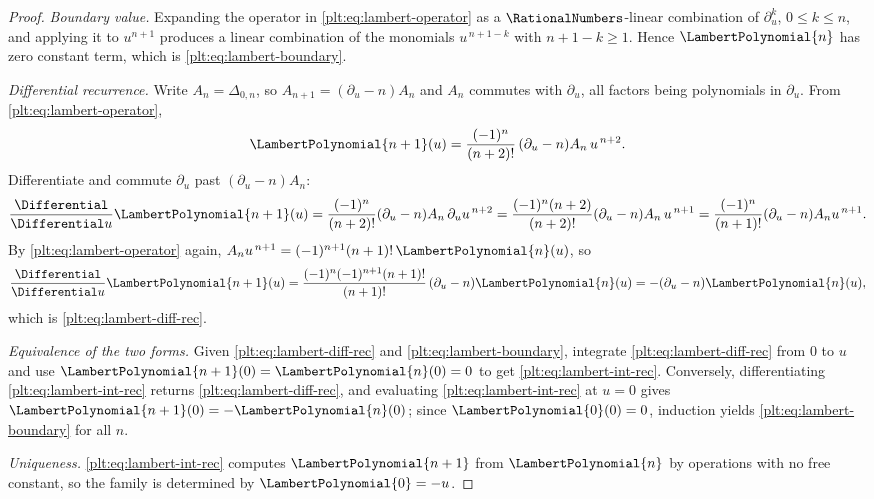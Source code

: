 \documentclass[11pt,oneside]{article}
\theoremstyle{plain}
\theoremstyle{definition}
\theoremstyle{remark}
\newcommand{\shiftop}[2]{\Delta_{#1,#2}}                 %
\newcommand{\LamP}[1]{\LambertPolynomial{#1}}
\begin{document}
\begin{proof}
\emph{Boundary value.}  Expanding the operator in
\eqref{plt:eq:lambert-operator} as a \(\RationalNumbers\)-linear combination
of \(\partial_u^{k}\), \(0\le k\le n\), and applying it to \(u^{n+1}\)
produces a linear combination of the monomials \(u^{\,n+1-k}\) with
\(n+1-k\ge1\).  Hence \(\LamP{n}\) has zero constant term, which is
\eqref{plt:eq:lambert-boundary}.

\emph{Differential recurrence.}  Write \(A_n=\shiftop{0}{n}\), so
\(A_{n+1}=(\partial_u-n)A_n\) and \(A_n\) commutes with \(\partial_u\), all
factors being polynomials in \(\partial_u\).  From
\eqref{plt:eq:lambert-operator},
\[
 \LamP{n+1}(u)=\frac{(-1)^{n}}{(n+2)!}\,(\partial_u-n)A_n\,u^{\,n+2}.
\]
Differentiate and commute \(\partial_u\) past \((\partial_u-n)A_n\):
\[
 \frac{\Differential}{\Differential u}\LamP{n+1}(u)
 =\frac{(-1)^{n}}{(n+2)!}(\partial_u-n)A_n\,\partial_uu^{\,n+2}
 =\frac{(-1)^{n}(n+2)}{(n+2)!}(\partial_u-n)A_n\,u^{\,n+1}
 =\frac{(-1)^{n}}{(n+1)!}(\partial_u-n)A_nu^{\,n+1}.
\]
By \eqref{plt:eq:lambert-operator} again,
\(A_nu^{\,n+1}=(-1)^{n+1}(n+1)!\,\LamP{n}(u)\), so
\[
 \frac{\Differential}{\Differential u}\LamP{n+1}(u)
 =\frac{(-1)^{n}(-1)^{n+1}(n+1)!}{(n+1)!}\,(\partial_u-n)\LamP{n}(u)
 =-(\partial_u-n)\LamP{n}(u),
\]
which is \eqref{plt:eq:lambert-diff-rec}.

\emph{Equivalence of the two forms.}  Given
\eqref{plt:eq:lambert-diff-rec} and \eqref{plt:eq:lambert-boundary},
integrate \eqref{plt:eq:lambert-diff-rec} from \(0\) to \(u\) and use
\(\LamP{n+1}(0)=\LamP{n}(0)=0\) to get
\eqref{plt:eq:lambert-int-rec}.  Conversely, differentiating
\eqref{plt:eq:lambert-int-rec} returns \eqref{plt:eq:lambert-diff-rec}, and
evaluating \eqref{plt:eq:lambert-int-rec} at \(u=0\) gives
\(\LamP{n+1}(0)=-\LamP{n}(0)\); since \(\LamP{0}(0)=0\), induction yields
\eqref{plt:eq:lambert-boundary} for all \(n\).

\emph{Uniqueness.}  \eqref{plt:eq:lambert-int-rec} computes \(\LamP{n+1}\)
from \(\LamP{n}\) by operations with no free constant, so the family is
determined by \(\LamP{0}=-u\).
\end{proof}
\end{document}
